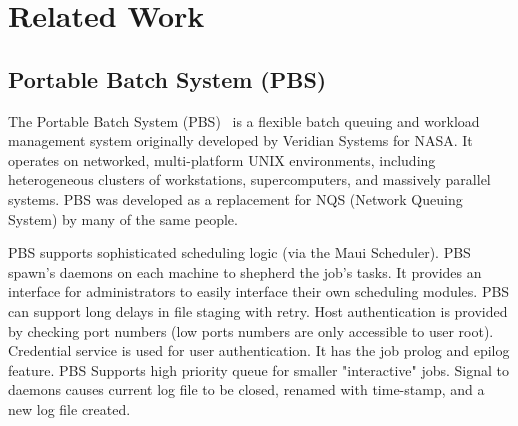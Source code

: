 \section{Related Work}
\subsection*{Portable Batch System (PBS)}

The Portable Batch System (PBS)~\cite{PBS}
is a flexible batch queuing and 
workload management system originally developed by Veridian Systems 
for NASA.  It operates on networked, multi-platform UNIX environments, 
including heterogeneous clusters of workstations, supercomputers, and 
massively parallel systems. PBS was developed as a replacement for 
NQS (Network Queuing System) by many of the same people.

PBS supports sophisticated scheduling logic (via the Maui 
Scheduler). 
PBS spawn's daemons on each 
machine to shepherd the job's tasks.
It provides an interface for administrators to easily 
interface their own scheduling modules.  PBS can support 
long delays in file staging with retry.  Host 
authentication is provided by checking port numbers (low ports numbers are only 
accessible to user root).  Credential service is used for user authentication. 
It has the job prolog and epilog feature.
PBS Supports 
high priority queue for smaller "interactive" jobs.  Signal to daemons 
causes current log file to be closed, renamed with 
time-stamp, and a new log file created.

